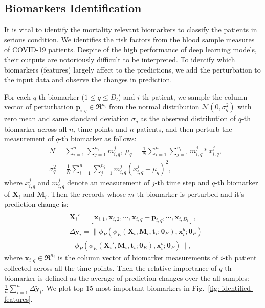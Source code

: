 \subsection{Biomarkers Identification}
It is vital to identify the mortality relevant biomarkers to classify the patients in serious condition. We identifies the risk factors from the blood sample measures of COVID-19 patients. Despite of the high performance of deep learning models, their outputs are notoriously difficult to be interpreted. To identify which biomarkers (features) largely affect to the predictions, we add the perturbation to the input data and observe the changes in prediction.

For each $q$-th biomarker ($1 \leq q \leq D_l$) and $i$-th patient, we sample the column vector of perturbation $\mathbf{p}_{i,q} \in \Re^{n_i}$ from the normal distribution $\mathcal{N}(0, \sigma_q^2)$ with zero mean and same standard deviation $\sigma_q$ as the observed distribution of $q$-th biomarker across all $n_i$ time points and $n$ patients, and then perturb the measurement of $q$-th biomarker as follows:
\begin{equation}
\begin{aligned}
    &N = \sum_{i=1}^n \sum_{j=1}^{n_i} m^j_{i,q},\ \mu_q = \frac{1}{N}\sum_{i=1}^n \sum_{j=1}^{n_i} m_{i,q}^j * x_{i,q}^j,\\
    &\sigma_q^2 = \frac{1}{N}\sum_{i=1}^n \sum_{j=1}^{n_i} m_{i,q}^j(x_{i,q}^j - \mu_q)^2,
\end{aligned}
\end{equation}
where $x_{i,q}^j$ and $m_{i,q}^j$ denote an measurement of $j$-th time step and $q$-th biomarker of $\mathbf{X}_i$ and $\mathbf{M}_i$.
Then the records whose $m$-th biomarker is perturbed and it's prediction change is:
\begin{equation}
\begin{aligned}
    &\mathbf{X}_i' = [\mathbf{x}_{i, 1}, \mathbf{x}_{i, 2}, \cdots, \mathbf{x}_{i, q} + \mathbf{p}_{i, q}, \cdots, \mathbf{x}_{i, D_l}],\\
    &\Delta\tilde{\mathbf{y}}_i = \| \phi_P(\phi_E(\mathbf{X}_i, \mathbf{M}_i, \mathbf{t}_i; \mathbf{\theta}_E), \mathbf{x}_i^b; \mathbf{\theta}_P)\\
    &- \phi_P(\phi_E(\mathbf{X}_i', \mathbf{M}_i, \mathbf{t}_i; \mathbf{\theta}_E), \mathbf{x}_i^b; \mathbf{\theta}_P) \|,
\end{aligned}
\end{equation}
where $\mathbf{x}_{i, q} \in \Re^{n_i}$ is the column vector of biomarker measurements of $i$-th patient collected across all the time points. Then the relative importance of $q$-th biomarker is defined as the average of prediction changes over the all samples: $\frac{1}{n}\sum_{i=1}^n\Delta\tilde{\mathbf{y}}_i$. We plot top 15 most important biomarkers in Fig.~\ref{fig: identified-features}.

